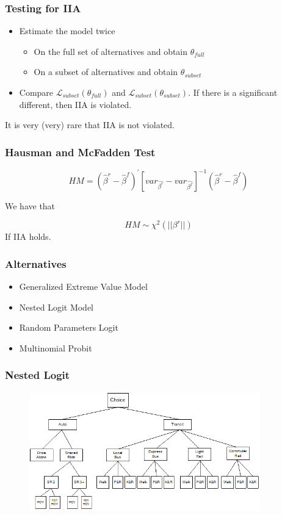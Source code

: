 \documentclass{beamer}
\newcommand{\Lik}{\mathcal{L}}
\newcommand{\1}{\mathbb{1}}
\begin{document}
\begin{frame}\frametitle{Testing for IIA}
\begin{itemize}
 \item Estimate the model twice 
 \begin{itemize}
  \item On the full set of alternatives and obtain $\theta_{full}$ 
  \item On a subset of alternatives and obtain $\theta_{subset}$
 \end{itemize}
\item  Compare $\Lik_{subset}(\theta_{full})$ and $\Lik_{subset}(\theta_{subset})$. If there is a significant different, then IIA is violated.
\end{itemize}
It is very (very) rare that IIA is not violated.
\end{frame}

\begin{frame}\frametitle{Hausman and McFadden Test}

\begin{equation}
 HM = (\hat{\beta}^r - \hat{\beta}^f)^{'}
[var_{\hat{\beta^r}} - var_{\hat{\beta^f}}]^{-1}
 (\hat{\beta}^r - \hat{\beta}^f)
\end{equation}

We have that 

\begin{equation}
 HM \sim \chi^2(|| \beta^r ||)
\end{equation}
 If IIA holds. 
\end{frame}


\begin{frame}\frametitle{Alternatives}
\begin{itemize}
 \item Generalized Extreme Value Model
 \item Nested Logit Model
 \item Random Parameters Logit
 \item Multinomial Probit 
\end{itemize}
\end{frame}

\begin{frame}\frametitle{Nested Logit}
\begin{figure}
\includegraphics[width = 10cm]{Plot/choice}
\end{figure}
\end{frame}
\end{document}
